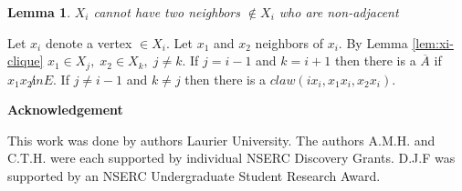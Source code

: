 \documentclass[12pt]{article}
\newtheorem{Lemma}[Theorem]{Lemma}
\begin{document}
\begin{Lemma}\label{lem:xi-neighbor-adjacent}
$X_i$ cannot have two neighbors $\not \in X_i$ who are non-adjacent
\end{Lemma}
 Let $x_i$ denote a vertex $\in X_i$. Let $x_1$ and $x_2$ neighbors of $x_i$. By Lemma \ref{lem:xi-clique} $x_1 \in X_j,\; x_2 \in X_k,\; j \neq k$. If $j=i-1$ and $k=i+1$ then there is a $\overline{A}$ if $x_1x_2 \not in E$. If $j \neq i-1$ and $k \neq j$ then there is a $claw (ix_i, x_1x_i,x_2x_i)$.



\begin{center}
{\bf Acknowledgement}
\end{center}
This work was done by authors  Laurier University. The authors A.M.H. and C.T.H. were each supported by individual NSERC Discovery Grants. D.J.F was supported by an NSERC Undergraduate Student Research Award.


\clearpage
\begin{thebibliography}{99}

\end{thebibliography}
\end{document}
